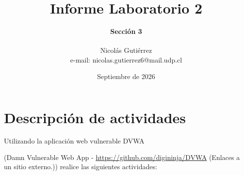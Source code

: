 \documentclass[letter,12pt]{article}
\begin{document}
%
   \title{\Huge{Informe Laboratorio 2}}

      \author{\textbf{Sección 3} \\  \\Nicolás Gutiérrez \\ e-mail: nicolas.gutierrez6@mail.udp.cl}
          
   \date{Septiembre de 2026}

   \maketitle
   
   \tableofcontents
 
  \newpage
  

\section{Descripción de actividades}
Utilizando la aplicación web vulnerable DVWA

(Damn Vulnerable Web App - \href{https://github.com/digininja/DVWA}{https://github.com/digininja/DVWA} (Enlaces a un sitio externo.)) realice las siguientes actividades:
\end{document}
